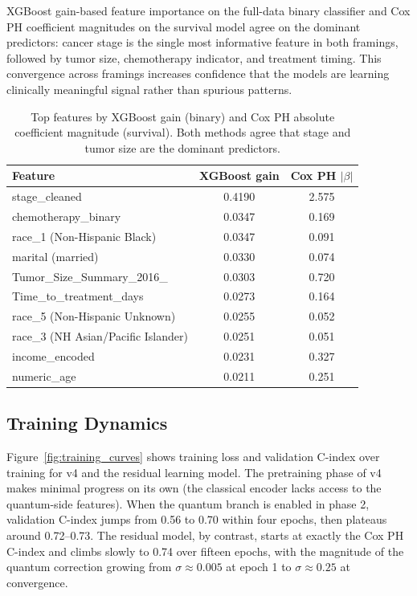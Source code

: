 \documentclass[12pt, letterpaper]{article}
\begin{document}
XGBoost gain-based feature importance on the full-data binary classifier and Cox PH coefficient magnitudes on the survival model agree on the dominant predictors: cancer stage is the single most informative feature in both framings, followed by tumor size, chemotherapy indicator, and treatment timing. This convergence across framings increases confidence that the models are learning clinically meaningful signal rather than spurious patterns.

\begin{table}[h!]
\centering
\caption{Top features by XGBoost gain (binary) and Cox PH absolute coefficient magnitude (survival). Both methods agree that stage and tumor size are the dominant predictors.}
\label{tab:feature_importance}
\begin{tabular}{@{}lcc@{}}
\toprule
\textbf{Feature} & \textbf{XGBoost gain} & \textbf{Cox PH $|\beta|$} \\
\midrule
stage\_cleaned                                  & 0.4190 & 2.575 \\
chemotherapy\_binary                            & 0.0347 & 0.169 \\
race\_1 (Non-Hispanic Black)                    & 0.0347 & 0.091 \\
marital (married)                               & 0.0330 & 0.074 \\
Tumor\_Size\_Summary\_2016\_                    & 0.0303 & 0.720 \\
Time\_to\_treatment\_days                        & 0.0273 & 0.164 \\
race\_5 (Non-Hispanic Unknown)                  & 0.0255 & 0.052 \\
race\_3 (NH Asian/Pacific Islander)             & 0.0251 & 0.051 \\
income\_encoded                                 & 0.0231 & 0.327 \\
numeric\_age                                    & 0.0211 & 0.251 \\
\bottomrule
\end{tabular}
\end{table}

\subsection{Training Dynamics}

Figure~\ref{fig:training_curves} shows training loss and validation C-index over training for v4 and the residual learning model. The pretraining phase of v4 makes minimal progress on its own (the classical encoder lacks access to the quantum-side features). When the quantum branch is enabled in phase 2, validation C-index jumps from 0.56 to 0.70 within four epochs, then plateaus around 0.72--0.73. The residual model, by contrast, starts at exactly the Cox PH C-index and climbs slowly to 0.74 over fifteen epochs, with the magnitude of the quantum correction growing from $\sigma \approx 0.005$ at epoch 1 to $\sigma \approx 0.25$ at convergence.
\end{document}

